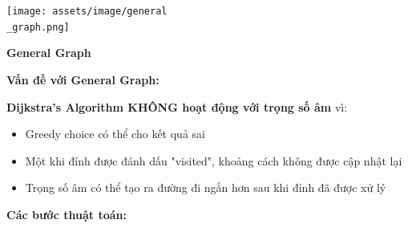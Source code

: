 \documentclass[12pt,a4paper]{article}
\begin{document}
{\centering
    \texttt{[image: assets/image/general\\\_graph.png]}
\par}

{\centering
\textbf{General Graph}
\par}
\vspace{1cm}

\textbf {Vấn đề  với General Graph:}

\textbf{Dijkstra's Algorithm KHÔNG hoạt động với trọng số âm} vì:
\begin{itemize}[label=\textbullet]
    \item Greedy choice có thể cho kết quả sai
    \item Một khi đỉnh được đánh dấu "visited", khoảng cách không được cập nhật lại
    \item Trọng số âm có thể tạo ra đường đi ngắn hơn sau khi đỉnh đã được xử lý
\end{itemize}

\textbf{Các bước thuật toán:}
\end{document}
